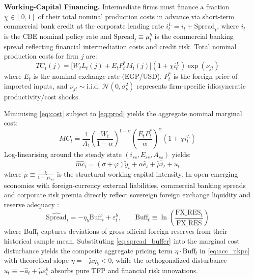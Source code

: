 \documentclass[review,12pt]{elsarticle}
\begin{document}
\textbf{Working-Capital Financing.} Intermediate firms must finance a fraction
$\chi \in [0,1]$ of their total nominal production costs in advance via short-term
commercial bank credit at the corporate lending rate $i_t^L = i_t + \text{Spread}_t$,
where $i_t$ is the CBE nominal policy rate and $\text{Spread}_t \equiv \mu_t^b$ is the
commercial banking spread reflecting financial intermediation costs and credit risk.
Total nominal production costs for firm $j$ are:
\begin{equation}
TC_t(j) = \bigl[W_t L_t(j) + E_t P_t^{*} M_t(j)\bigr](1 + \chi i_t^L) \exp(\nu_{jt})
\label{eq:cost}
\end{equation}
where $E_t$ is the nominal exchange rate (EGP/USD), $P_t^{*}$ is the foreign price
of imported inputs, and $\nu_{jt} \sim \text{i.i.d. } \mathcal{N}(0, \sigma_\nu^2)$
represents firm-specific idiosyncratic productivity/cost shocks.

Minimising \eqref{eq:cost} subject to \eqref{eq:prod} yields the aggregate nominal
marginal cost:
\begin{equation}
MC_t = \frac{1}{A_t}\left(\frac{W_t}{1-\alpha}\right)^{1-\alpha}\left(\frac{E_t P_t^{*}}{\alpha}\right)^{\alpha}(1 + \chi i_t^L)
\label{eq:mc}
\end{equation}
Log-linearising around the steady state $(i_{ss}, E_{ss}, A_{ss})$ yields:
\begin{equation}
\widehat{mc}_t = (\sigma+\varphi)\tilde{y}_t + \alpha \hat{e}_t + \tilde{\mu} \tilde{i}_t + u_t
\label{eq:mc_linear}
\end{equation}
where $\tilde{\mu} \equiv \frac{\chi}{1 + \chi i_{ss}}$ is the structural working-capital intensity. In open emerging economies with foreign-currency external liabilities, commercial banking spreads and corporate risk premia directly reflect sovereign foreign exchange liquidity and reserve adequacy \citep{shin2014}:
\begin{equation}
\widehat{\text{Spread}}_t = -\eta_b \text{Buff}_t + \varepsilon_t^b, \qquad \text{Buff}_t \equiv \ln\left(\frac{\text{FX\_RES}_t}{\overline{\text{FX\_RES}}}\right)
\label{eq:spread_buffer}
\end{equation}
where $\text{Buff}_t$ captures deviations of gross official foreign reserves from their historical sample mean. Substituting \eqref{eq:spread_buffer} into the marginal cost disturbance yields the composite aggregate pricing term $\eta \cdot \text{Buff}_t$ in \eqref{eq:acc_nkpc} with theoretical slope $\eta = -\tilde{\mu}\eta_b < 0$, while the orthogonalized disturbance $u_t \equiv -\hat{a}_t + \tilde{\mu}\varepsilon_t^b$ absorbs pure TFP and financial risk innovations.
\end{document}
